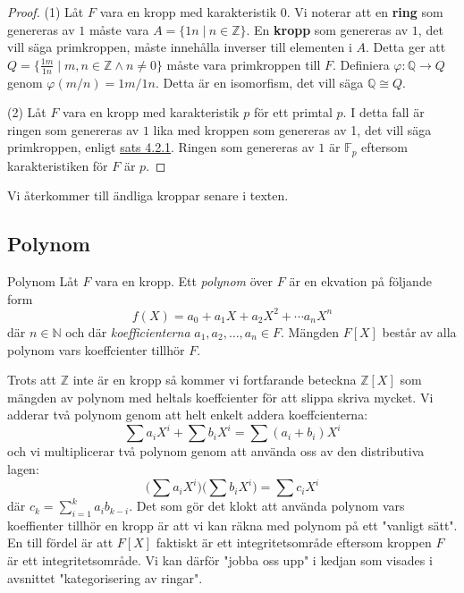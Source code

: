 \documentclass{article}
\theoremstyle{definition}
\begin{document}
\begin{proof}
  (1) Låt $F$ vara en kropp med karakteristik 0. Vi noterar att en \textbf{ring} som genereras av $1$ måste vara $A = \{1n \; | \: n \in \mathbb{Z}\}$. 
  En \textbf{kropp} som genereras av $1$, det vill säga primkroppen, måste innehålla inverser till elementen i $A$. 
  Detta ger att $Q = \{ \frac{1m}{1n} \; | \; m, n \in \mathbb{Z} \wedge  n \neq 0\}$ måste vara primkroppen till $F$. 
  Definiera $\varphi: \mathbb{Q} \rightarrow Q$ genom $\varphi(m/n) = 1m/1n$. Detta är en isomorfism, det vill säga $\mathbb{Q} \cong Q.$

  (2) Låt $F$ vara en kropp med karakteristik $p$ för ett primtal $p.$ I detta fall är ringen som genereras av $1$ lika med 
  kroppen som genereras av 1, det vill säga primkroppen, enligt \hyperlink{zpkropp}{sats 4.2.1}. Ringen som genereras av $1$ är 
  $\mathbb{F}_p$ eftersom karakteristiken för $F$ är $p$.
\end{proof}

Vi återkommer till ändliga kroppar senare i texten.

\subsection{Polynom}
\begin{mydef}{Polynom}{}
  Låt $F$ vara en kropp. Ett \textit{polynom} över $F$ är en ekvation på följande form
  \[f(X) = a_0 + a_1X + a_2X^2 + \cdots a_nX^n\]
  där $n \in \mathbb{N}$ och där \textit{koefficienterna} $a_1, a_2, \ldots, a_n \in F$. 
  Mängden $F[X]$ består av alla polynom vars koeffcienter tillhör $F$.
\end{mydef}
Trots att $\mathbb{Z}$ inte är en kropp så kommer vi fortfarande beteckna $\mathbb{Z}[X]$ som mängden av polynom med heltals koeffcienter
för att slippa skriva mycket. Vi adderar två polynom genom att 
helt enkelt addera koeffcienterna:
\[ \sum a_iX^i + \sum b_iX^i = \sum (a_i + b_i)X^i \]
och vi multiplicerar två polynom genom att använda oss av den distributiva lagen: 
\[ \biggl( \sum a_iX^i \biggr) \biggl( \sum b_iX^i \biggr) = \sum c_iX^i \]
där $c_k = \sum_{i = 1}^k a_ib_{k-i}.$ Det som gör det klokt att använda polynom vars koeffienter tillhör en kropp är att vi kan 
räkna med polynom på ett "vanligt sätt". En till fördel är att $F[X]$ faktiskt är ett integritetsområde eftersom kroppen $F$ är ett integritetsområde. 
Vi kan därför "jobba oss upp" i kedjan som visades i avsnittet "kategorisering av ringar". 
\end{document}
